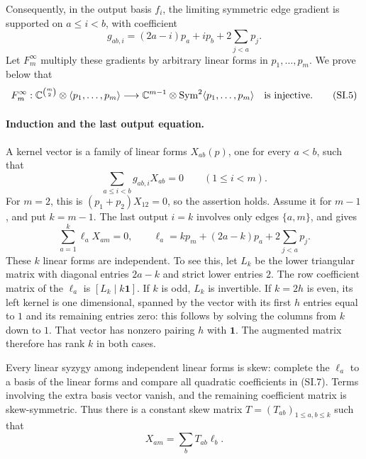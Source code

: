 Consequently, in the output basis \(f_i\), the limiting
symmetric edge gradient is supported on \(a\leq i<b\), with
coefficient
\[
 g_{ab,i}=(2a-i)p_a+i p_b+2\sum_{j<a}p_j.
                                                               \tag{SI.4}
\]
Let \(F_m^\infty\) multiply these gradients by arbitrary
linear forms in \(p_1,\ldots,p_m\). We prove below that
\[
 F_m^\infty:\mathbb C^{\binom m2}\otimes
              \langle p_1,\ldots,p_m\rangle
       \longrightarrow
          \mathbb C^{m-1}\otimes
                 \operatorname{Sym}^2\langle p_1,\ldots,p_m\rangle
                   \quad\hbox{is injective.}
                                                               \tag{SI.5}
\]

\paragraph{Induction and the last output equation.}
A kernel vector is a family of linear forms \(X_{ab}(p)\),
one for every \(a<b\), such that
\[
 \sum_{a\leq i<b}g_{ab,i}X_{ab}=0
                      \qquad(1\leq i<m).
                                                               \tag{SI.6}
\]
For \(m=2\), this is \((p_1+p_2)X_{12}=0\), so the assertion
holds. Assume it for \(m-1\), and put \(k=m-1\).
The last output \(i=k\) involves only edges \(\{a,m\}\),
and gives
\[
 \sum_{a=1}^k\ell_a X_{am}=0,
 \qquad
 \ell_a=k p_m+(2a-k)p_a+2\sum_{j<a}p_j.
                                                               \tag{SI.7}
\]
These \(k\) linear forms are independent.
To see this, let \(L_k\) be the lower triangular matrix
with diagonal entries \(2a-k\) and strict lower entries \(2\).
The row coefficient matrix of the \(\ell_a\) is
\([L_k\mid k\mathbf1]\).
If \(k\) is odd, \(L_k\) is invertible.
If \(k=2h\) is even, its left kernel is one dimensional,
spanned by the vector with its first \(h\) entries equal
to \(1\) and its remaining entries zero: this follows
by solving the columns from \(k\) down to \(1\).
That vector has nonzero pairing \(h\) with \(\mathbf1\).
The augmented matrix therefore has rank \(k\) in both cases.

Every linear syzygy among independent linear forms is skew:
complete the \(\ell_a\) to a basis of the linear forms and
compare all quadratic coefficients in (SI.7). Terms involving
the extra basis vector vanish, and the remaining coefficient
matrix is skew-symmetric. Thus there is a constant skew matrix
\(T=(T_{ab})_{1\leq a,b\leq k}\) such that
\[
                     X_{am}=\sum_b T_{ab}\ell_b.
                                                               \tag{SI.8}
\]

